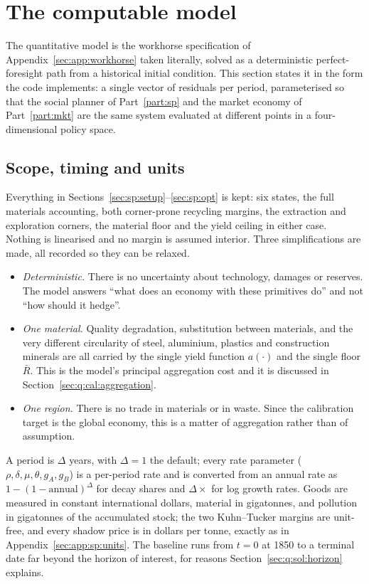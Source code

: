 \section{The computable model}\label{sec:q:model}

The quantitative model is the workhorse specification of Appendix~\ref{sec:app:workhorse} taken literally, solved as a deterministic perfect-foresight path from a historical initial condition. This section states it in the form the code implements: a single vector of residuals per period, parameterised so that the social planner of Part~\ref{part:sp} and the market economy of Part~\ref{part:mkt} are the same system evaluated at different points in a four-dimensional policy space.

\subsection{Scope, timing and units}\label{sec:q:model:scope}

 Everything in Sections~\ref{sec:sp:setup}--\ref{sec:sp:opt} is kept: six states, the full materials accounting, both corner-prone recycling margins, the extraction and exploration corners, the material floor and the yield ceiling in either case. Nothing is linearised and no margin is assumed interior. Three simplifications are made, all recorded so they can be relaxed.
\begin{itemize}
\item \emph{Deterministic.} There is no uncertainty about technology, damages or reserves. The model answers ``what does an economy with these primitives do'' and not ``how should it hedge''.
\item \emph{One material.} Quality degradation, substitution between materials, and the very different circularity of steel, aluminium, plastics and construction minerals are all carried by the single yield function $a\left(\cdot\right)$ and the single floor $\bar R$. This is the model's principal aggregation cost and it is discussed in Section~\ref{sec:q:cal:aggregation}.
\item \emph{One region.} There is no trade in materials or in waste. Since the calibration target is the global economy, this is a matter of aggregation rather than of assumption.
\end{itemize}

 A period is $\Delta$ years, with $\Delta=1$ the default; every rate parameter ($\rho,\delta,\mu,\theta,g_A,g_B$) is a per-period rate and is converted from an annual rate as $1-\left(1-\text{annual}\right)^{\Delta}$ for decay shares and $\Delta\times$ for log growth rates. Goods are measured in constant international dollars, material in gigatonnes, and pollution in gigatonnes of the accumulated stock; the two Kuhn--Tucker margins are unit-free, and every shadow price is in dollars per tonne, exactly as in Appendix~\ref{sec:app:sp:units}. The baseline runs from $t=0$ at 1850 to a terminal date far beyond the horizon of interest, for reasons Section~\ref{sec:q:sol:horizon} explains.

